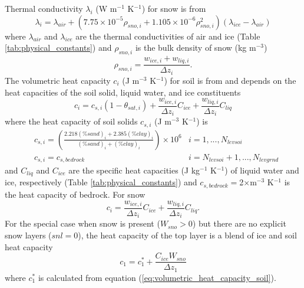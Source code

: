 \documentclass[12pt,authoryear]{elsarticle}
\numberwithin{equation}{section} %
\begin{document}
Thermal conductivity $\lambda_{i}$ (W m$^{-1}$ K$^{-1}$) for snow is from \cite{jordanOnedimensionalTemperatureModel1991}
\begin{equation}
\lambda_{i} = \lambda_{air}+(7.75\times10^{-5}\rho_{sno,i}+1.105\times10^{-6}\rho_{sno,i}^2)(\lambda_{ice}-\lambda_{air})
\end{equation}
where $\lambda_{air}$ and $\lambda_{ice}$ are the thermal conductivities of air and ice (Table \ref{tab:physical_constants}) and $\rho_{sno,i}$ is the bulk density of snow (kg m$^{-3}$)
\begin{equation}
\rho_{sno,i}=\frac{w_{ice,i}+w_{liq,i}}{\Delta z_{i}}.
\end{equation}
The volumetric heat capacity $c_{i}$ (J m$^{-3}$ K$^{-1}$) for soil is from \cite{devriesThermalPropertiesSoils1963} and depends on the heat capacities of the soil solid, liquid water, and ice constituents
\begin{equation}
\label{eq:volumetric_heat_capacity_soil}
c_{i}=c_{s,i}(1-\theta_{sat,i})+\frac{w_{ice,i}}{\Delta z_{i}}C_{ice} +\frac{w_{liq,i}}{\Delta z_{i}}C_{liq}
\end{equation}
where the heat capacity of soil solids $c_{s,i}$ (J m$^{-3}$ K$^{-1}$) is 
\begin{equation}
\begin{aligned}
& c_{s,i} = \left(\frac{2.218(\%sand)_{i}+2.385(\%clay)_{i}}{(\%sand)_{i}+(\%clay)_{i}}\right) \times 10^{6} & i=1,...,N_{levsoi} \\
& c_{s,i} = c_{s,bedrock} & i=N_{levsoi}+1,...,N_{levgrnd}
\end{aligned}
\end{equation}
and $C_{liq}$ and $C_{ice}$ are the specific heat capacities (J kg$^{-1}$ K$^{-1}$) of liquid water and ice, respectively (Table \ref{tab:physical_constants}) and $c_{s,bedrock}=$2$\times$m$^{-3}$ K$^{-1}$ is the heat capacity of bedrock. For snow
\begin{equation}
c_{i} = \frac{w_{ice,i}}{\Delta z_{i}}C_{ice}+\frac{w_{liq,i}}{\Delta z_{i}}C_{liq}.
\end{equation}
For the special case when snow is present ($W_{sno}>$0) but there are no explicit snow layers ($snl=$0), the heat capacity of the top layer is a blend of ice and soil heat capacity
\begin{equation}
c_{1}=c_{1}^{*}+\frac{C_{ice}W_{sno}}{\Delta z_{1}}
\end{equation}
where $c_{1}^{*}$ is calculated from equation (\ref{eq:volumetric_heat_capacity_soil}).
\end{document}
